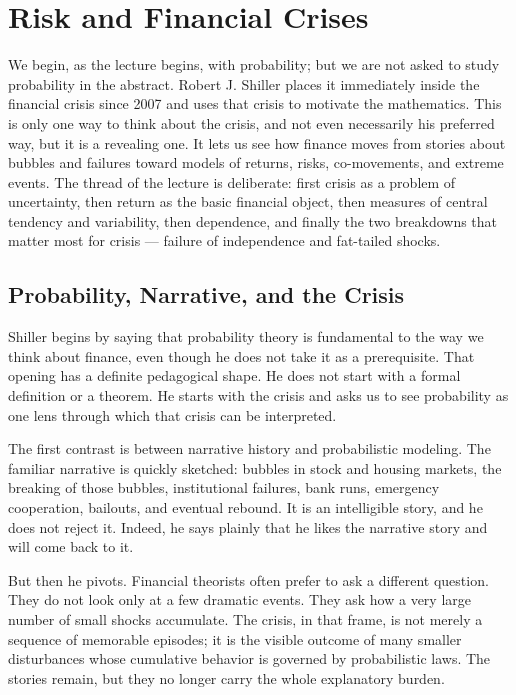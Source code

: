 \chapter{Risk and Financial Crises}

We begin, as the lecture begins, with probability; but we are not asked to study probability in the abstract. Robert J. Shiller places it immediately inside the financial crisis since 2007 and uses that crisis to motivate the mathematics. This is only one way to think about the crisis, and not even necessarily his preferred way, but it is a revealing one. It lets us see how finance moves from stories about bubbles and failures toward models of returns, risks, co-movements, and extreme events. The thread of the lecture is deliberate: first crisis as a problem of uncertainty, then return as the basic financial object, then measures of central tendency and variability, then dependence, and finally the two breakdowns that matter most for crisis --- failure of independence and fat-tailed shocks.

\section{Probability, Narrative, and the Crisis}

Shiller begins by saying that probability theory is fundamental to the way we think about finance, even though he does not take it as a prerequisite. That opening has a definite pedagogical shape. He does not start with a formal definition or a theorem. He starts with the crisis and asks us to see probability as one lens through which that crisis can be interpreted.

The first contrast is between narrative history and probabilistic modeling. The familiar narrative is quickly sketched: bubbles in stock and housing markets, the breaking of those bubbles, institutional failures, bank runs, emergency cooperation, bailouts, and eventual rebound. It is an intelligible story, and he does not reject it. Indeed, he says plainly that he likes the narrative story and will come back to it.

But then he pivots. Financial theorists often prefer to ask a different question. They do not look only at a few dramatic events. They ask how a very large number of small shocks accumulate. The crisis, in that frame, is not merely a sequence of memorable episodes; it is the visible outcome of many smaller disturbances whose cumulative behavior is governed by probabilistic laws. The stories remain, but they no longer carry the whole explanatory burden.

